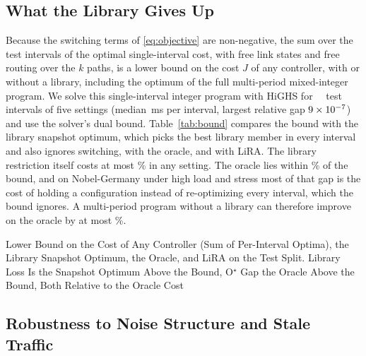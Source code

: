 \documentclass[5p,times]{elsarticle}
\begin{document}
\subsection{What the Library Gives Up}\label{sec:res-bound}

Because the switching terms of \eqref{eq:objective} are non-negative, the sum over the test intervals of the optimal single-interval cost, with free link states and free routing over the $k$ paths, is a lower bound on the cost $J$ of any controller, with or without a library, including the optimum of the full multi-period mixed-integer program. We solve this single-interval integer program with HiGHS for \boundAllOptimal\ \boundIntervals\ test intervals of five settings (median \boundMedianMs\,ms per interval, largest relative gap $9\times10^{-7}$) and use the solver's dual bound. Table~\ref{tab:bound} compares the bound with the library snapshot optimum, which picks the best library member in every interval and also ignores switching, with the oracle, and with LiRA. The library restriction itself costs at most \boundMaxLoss\% in any setting. The oracle lies within \boundMaxGap\% of the bound, and on Nobel-Germany under high load and stress most of that gap is the cost of holding a configuration instead of re-optimizing every interval, which the bound ignores. A multi-period program without a library can therefore improve on the oracle by at most \boundMaxGap\%.

\begin{table}[t]
\centering
\caption{Lower Bound on the Cost of Any Controller (Sum of Per-Interval Optima), the Library Snapshot Optimum, the Oracle, and LiRA on the Test Split. Library Loss Is the Snapshot Optimum Above the Bound, O$^\star$ Gap the Oracle Above the Bound, Both Relative to the Oracle Cost}
\label{tab:bound}
\scriptsize
\setlength{\tabcolsep}{2pt}
\begin{adjustbox}{max width=\linewidth}\end{adjustbox}
\end{table}

\subsection{Robustness to Noise Structure and Stale Traffic}\label{sec:res-robust}
\end{document}

